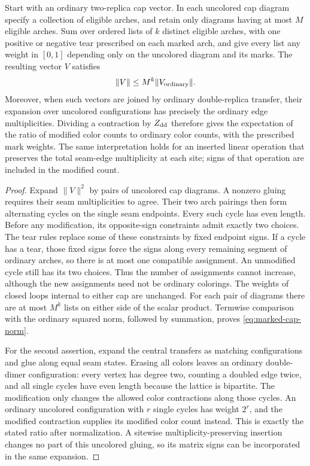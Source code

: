 \begin{lemma}\label{lem:marked-cap}
Start with an ordinary two-replica cap vector.  In each uncolored cap
diagram specify a collection of eligible arches, and retain only diagrams
having at most $M$ eligible arches.  Sum over ordered lists of $k$
distinct eligible arches, with one positive or negative tear prescribed
on each marked arch, and give every list any weight in $[0,1]$ depending
only on the uncolored diagram and its marks.  The resulting vector $V$ satisfies
\begin{equation}\label{eq:marked-cap-norm}
 \|V\|\le M^k\|V_{\rm ordinary}\|.
\end{equation}
Moreover, when such vectors are joined by ordinary double-replica
transfer, their expansion over uncolored configurations has precisely
the ordinary edge multiplicities.  Dividing a contraction by
$Z_{\rm dd}$ therefore gives the expectation of the ratio of modified
color counts to ordinary color counts, with the prescribed mark weights.
The same interpretation holds for an inserted linear operation that
preserves the total seam-edge multiplicity at each site; signs of that
operation are included in the modified count.
\end{lemma}

\begin{proof}
Expand $\|V\|^2$ by pairs of uncolored cap diagrams.  A nonzero gluing
requires their seam multiplicities to agree.  Their two arch pairings
then form alternating cycles on the single seam endpoints.  Every such
cycle has even length.  Before any modification, its opposite-sign
constraints admit exactly two choices.  The tear rules replace some
of these constraints by fixed endpoint signs.  If a cycle has a tear,
those fixed signs force the signs along every remaining segment of
ordinary arches, so there is at most one compatible assignment.
An unmodified cycle still has its two choices.  Thus the number of
assignments cannot increase, although the new assignments need not be
ordinary colorings.  The weights of closed loops internal to either cap
are unchanged.  For each pair of diagrams there are at most $M^k$ lists
on either side of the scalar product.  Termwise comparison with the
ordinary squared norm, followed by summation, proves
\eqref{eq:marked-cap-norm}.

For the second assertion, expand the central transfers as matching
configurations and glue along equal seam states.  Erasing all colors
leaves an ordinary double-dimer configuration: every vertex has degree
two, counting a doubled edge twice, and all single cycles have even
length because the lattice is bipartite.  The modification only changes
the allowed color contractions along those cycles.  An ordinary
uncolored configuration with $r$ single cycles has weight $2^r$, and the
modified contraction supplies its modified color count instead.  This
is exactly the stated ratio after normalization.  A sitewise
multiplicity-preserving insertion changes no part of this uncolored
gluing, so its matrix signs can be incorporated in the same expansion.
\end{proof}

